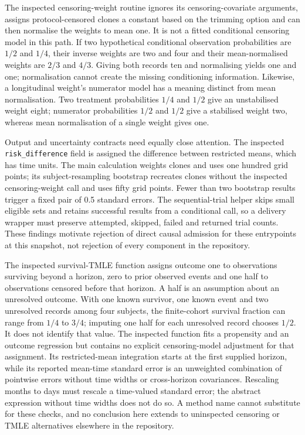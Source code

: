The inspected censoring-weight routine ignores its censoring-covariate arguments,
assigns protocol-censored clones a constant based on the trimming option and can
then normalise the weights to mean one. It is not a fitted conditional censoring
model in this path. If two hypothetical conditional observation probabilities are
$1/2$ and $1/4$, their inverse weights are two and four and their mean-normalised
weights are $2/3$ and $4/3$. Giving both records ten and normalising yields one
and one; normalisation cannot create the missing conditioning information.
Likewise, a longitudinal weight's numerator model has a meaning distinct from mean
normalisation. Two treatment probabilities $1/4$ and $1/2$ give an unstabilised
weight eight; numerator probabilities $1/2$ and $1/2$ give a stabilised weight two,
whereas mean normalisation of a single weight gives one.
\citep{exec24_survivalother_rustcore,exec24_survivalother_reference}

Output and uncertainty contracts need equally close attention. The inspected
\texttt{risk\_difference} field is assigned the difference between restricted means,
which has time units. The main calculation weights clones and uses one hundred
grid points; its subject-resampling bootstrap recreates clones without the inspected
censoring-weight call and uses fifty grid points. Fewer than two bootstrap results
trigger a fixed pair of 0.5 standard errors. The sequential-trial helper skips
small eligible sets and retains successful results from a conditional call, so a
delivery wrapper must preserve attempted, skipped, failed and returned trial counts.
These findings motivate rejection of direct causal admission for these entrypoints
at this snapshot, not rejection of every component in the repository.
\citep{exec24_survivalother_rustcore}

The inspected survival-TMLE function assigns outcome one to observations surviving
beyond a horizon, zero to prior observed events and one half to observations censored
before that horizon. A half is an assumption about an unresolved outcome. With one
known survivor, one known event and two unresolved records among four subjects, the
finite-cohort survival fraction can range from $1/4$ to $3/4$; imputing one half for
each unresolved record chooses $1/2$. It does not identify that value. The inspected
function fits a propensity and an outcome regression but contains no explicit
censoring-model adjustment for that assignment. Its restricted-mean integration starts
at the first supplied horizon, while its reported mean-time standard error is an
unweighted combination of pointwise errors without time widths or cross-horizon
covariances. Rescaling months to days must rescale a time-valued standard error;
the abstract expression without time widths does not do so. A method name cannot
substitute for these checks, and no conclusion here extends to uninspected censoring
or TMLE alternatives elsewhere in the repository.
\citep{exec24_survivalother_rustcore,exec24_survivalother_reference}

